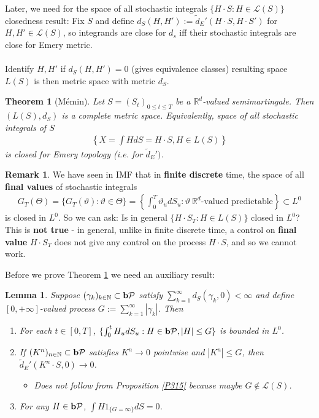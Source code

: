 \documentclass[12pt,a4paper, twoside]{article}
\newtheorem{lem}{Lemma}[section]
\newtheorem{thm}{Theorem}[section]
\theoremstyle{definition}
\newtheorem{rem}{Remark}[section]
\newcommand{\pred}{\textbf{\text{b}}\mathcal{P}}
\begin{document}
Later, we need for the space of all stochastic integrals $\{ H \cdot S : H \in \mathcal{L}(S) \}$ closedness result: Fix $S$ and define $d_S(H,H'):= \widetilde{d}_E'(H \cdot S , H \cdot S')$ for $H,H' \in \mathcal{L}(S)$, so integrands are close for $d_s$ iff their stochastic integrals are close for Emery metric. 
\\\\
Identify $H, H'$ if $d_S(H,H')=0$ (gives equivalence classes) resulting space $L(S)$ is then metric space with metric $d_S$. 
\newpage
\begin{thm}[Mémin] \label{T317} Let $S=(S_t)_{0 \leq t \leq T}$ be a $\mathbb{R}^d$-valued semimartingale. Then $(L(S), d_S)$ is a complete metric space. Equivalently, space of all stochastic integrals of $S$ 
\begin{align*}
\left\{ X= \int H dS = H \cdot S, H \in L(S) \right\}
\end{align*}
is closed for Emery topology (i.e. for $\widetilde{d}_E')$. 
\end{thm}
\begin{rem} We have seen in IMF that in \textbf{finite discrete} time, the space of all \textbf{final values} of stochastic integrals 
\begin{align*}
G_T( \Theta) = \{ G_T( \vartheta) : \vartheta \in \Theta\} = \left\{ \int_0^T \vartheta_u dS_u : \vartheta \ \mathbb{R}^d\text{-valued predictable} \right\} \subset L^0
\end{align*}
is closed in $L^0$. So we can ask: Is in general $\{ H \cdot S_T : H \in L(S) \}$ closed in $L^0$? 
\\
This is \textbf{not true} - in general, unlike in finite discrete time, a control on \textbf{final value} $H \cdot S_T$ does not give any control on the process $H \cdot S$, and so we cannot work. 
\end{rem}
Before we prove Theorem \ref{T317} we need an auxiliary result:
\begin{lem}\label{L316} Suppose $( \gamma_k)_{k \in \mathbb{N}} \subset \pred$ satisfy $\sum_{k=1}^\infty d_S( \gamma_k,0) < \infty$ and define $[0,+ \infty]$-valued process $G:= \sum_{k=1}^\infty | \gamma_k|$. Then 
\begin{enumerate}
\item For each $t \in [0,T]$, $ \{ \int_0^t H_u dS_u : H \in \pred , |H| \leq G \}$ is bounded in $L^0$. 
\item If $(K^n)_{n \in \mathbb{N}} \subset \pred$ satisfies $K^n \to 0$ pointwise and $|K^n| \leq G$, then \\ $\widetilde{d}_E'( K^n \cdot S,0) \to 0$. 
\begin{itemize}
\item Does not follow from Proposition \ref{P315} because maybe $G \notin \mathcal{L}(S)$.
\end{itemize}
\item For any $H \in \pred$, $ \int H 1_{\{ G = \infty\}} dS =0$. 
\end{enumerate}
\end{lem}
\end{document}
